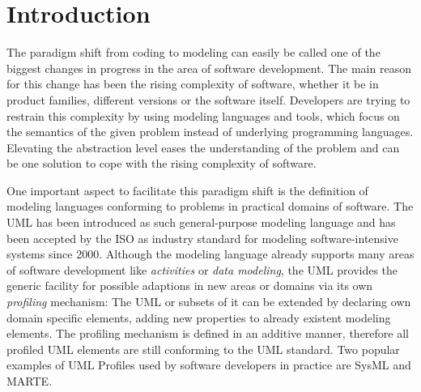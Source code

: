 \chapter*{Introduction}\label{introduction}
The paradigm shift from coding to modeling can easily be called one of the
biggest changes in progress in the area of software development. 
The main reason for this change has been the rising complexity of software,
whether it be in product families, different versions or the software itself.
Developers are trying to restrain this complexity by using modeling languages
and tools, which focus on the semantics of the given problem instead of
underlying programming languages.
Elevating the abstraction level eases the understanding of the problem and can
be one solution to cope with the rising complexity of software.

One important aspect to facilitate this paradigm shift is the definition of
modeling languages conforming to problems in practical domains of software. The
\ac{UML} has been introduced as such general-purpose modeling language and has
been accepted by the \ac{ISO} as industry standard for modeling
software-intensive systems since 2000. Although the modeling language already
supports many areas of software development like \textit{activities} or \textit{data modeling}, the \ac{UML} provides the generic facility for possible adaptions in
new areas or domains via its own \textit{profiling} mechanism: The \ac{UML} or
subsets of it can be extended by declaring own domain specific elements, adding
new properties to already existent modeling elements. The profiling mechanism is defined in an additive manner, therefore all profiled \ac{UML} elements are
still conforming to the \ac{UML} standard. Two popular examples of \ac{UML}
Profiles used by software developers in practice are \ac{SysML} and \ac{MARTE}.

